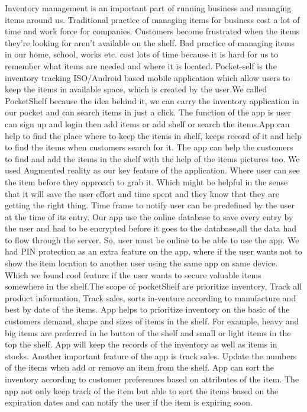 Inventory management is an important part of running business and managing items around us.  Traditional practice of managing items for business cost a lot of time and work force for companies.  Customers become frustrated when the items they're looking for aren't available on the shelf. Bad practice of managing items in our home, school, works etc. cost lots of time because it is hard for us to remember what items are needed and where it is located. Pocket-self is the inventory tracking ISO/Android based mobile application which allow users to keep the items in available space, which is created by the user.We called PocketShelf because the idea behind it, we can carry the inventory application in our pocket and can search items in just a click. The function of the app is user can sign up and login then add items or add shelf or search the items.App can help to find the place where to keep the items in shelf, keeps record of it and help to find the items when customers search for it.  The app can help the customers to find and add the items in the shelf with the help of the items pictures too.  We used Augmented reality as our key feature of the application.  Where user can see the item before they approach to grab it.  Which might be helpful in the sense that it will save the user effort and time spent and they know that they are getting the right thing. Time frame to notify user can be predefined by the user at the time of its entry. Our app use the online database to save every entry by the user and had to be encrypted before it goes to the database,all the data had to flow through the server.  So, user must be online to be able to use the app.  We had PIN protection as an extra feature on the app, where if the user wants not to show the item location to another user using the same app on same device.  Which we found cool feature if the user wants to secure valuable items somewhere in the shelf.The scope of pocketShelf are prioritize inventory, Track all product information, Track sales, sorts in-venture according to manufacture and best by date of the items.  App helps to prioritize inventory on the basic of the customers demand, shape and sizes of items in the shelf.  For example, heavy and big items are preferred in he button of the shelf and small or light items in the top the shelf. App will keep the records of the inventory as well as items in stocks.  Another important feature of the app is track sales.  Update the numbers of the items when add or remove an item from the shelf.  App can sort the inventory according to customer preferences based on attributes of the item.  The app not only keep track of the item but able to sort the items based on the expiration dates and can notify the user if the item is expiring soon.